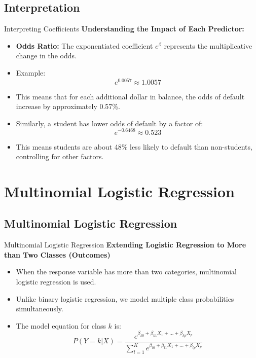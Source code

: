 \documentclass[aspectratio=169,xcolor=dvipsnames]{beamer}
\begin{document}
\subsection{Interpretation}
\begin{frame}{Interpreting Coefficients}
    \textbf{Understanding the Impact of Each Predictor:}
    \begin{itemize}
        \item \textbf{Odds Ratio:} The exponentiated coefficient \( e^{\beta} \) represents the multiplicative change in the odds.
        \item Example:
        \begin{equation}
            e^{0.0057} \approx 1.0057
        \end{equation}
        \item This means that for each additional dollar in balance, the odds of default increase by approximately 0.57\%.
        \item Similarly, a student has lower odds of default by a factor of:
        \begin{equation}
            e^{-0.6468} \approx 0.523
        \end{equation}
        \item This means students are about 48\% less likely to default than non-students, controlling for other factors.
    \end{itemize}
\end{frame}
\section{Multinomial Logistic Regression}
\subsection{Multinomial Logistic Regression}
\begin{frame}{Multinomial Logistic Regression}
    \textbf{Extending Logistic Regression to More than Two Classes (Outcomes)}
    \begin{itemize}
        \item When the response variable has more than two categories, multinomial logistic regression is used.
        \item Unlike binary logistic regression, we model multiple class probabilities simultaneously.
        \item The model equation for class \( k \) is:
        \begin{equation}
            P(Y = k | X) = \frac{e^{\beta_{k0} + \beta_{k1}X_1 + \dots + \beta_{kp}X_p}}{\sum_{l=1}^{K} e^{\beta_{l0} + \beta_{l1}X_1 + \dots + \beta_{lp}X_p}}
        \end{equation}
    \end{itemize}
\end{frame}
\end{document}
